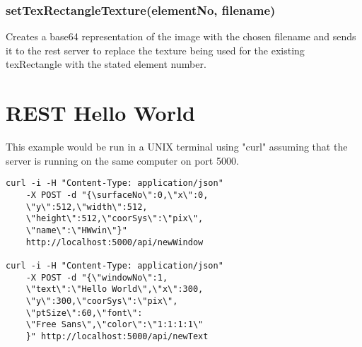 \documentclass{acm_proc_article-sp}
\begin{document}
\subsubsection{setTexRectangleTexture(elementNo, filename)}
Creates a base64 representation of the image with the chosen filename and sends it to the rest server to replace the texture being used for the existing texRectangle with the stated element number.


\section{REST Hello World}
This example would be run in a UNIX terminal using "curl" assuming that the server is running on the same computer on port 5000.

\begin{lstlisting}[frame=single]
curl -i -H "Content-Type: application/json" 
	-X POST -d "{\surfaceNo\":0,\"x\":0,
	\"y\":512,\"width\":512,
	\"height\":512,\"coorSys\":\"pix\",
	\"name\":\"HWwin\"}"
	http://localhost:5000/api/newWindow

curl -i -H "Content-Type: application/json" 
	-X POST -d "{\"windowNo\":1,
	\"text\":\"Hello World\",\"x\":300,
	\"y\":300,\"coorSys\":\"pix\",
	\"ptSize\":60,\"font\":
	\"Free Sans\",\"color\":\"1:1:1:1\"
	}" http://localhost:5000/api/newText


\end{lstlisting}
\end{document}
